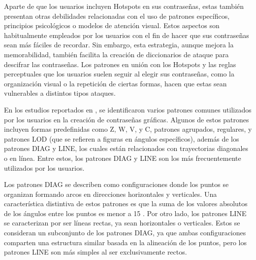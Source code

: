 \documentclass[12pt]{report}
\begin{document}
Aparte de que los usuarios incluyen Hotspots en sus contraseñas, estas también presentan otras debilidades relacionadas con el uso de patrones específicos, principios psicológicos o modelos de atención visual. Estos aspectos son habitualmente empleados por los usuarios con el fin de hacer que sus contraseñas sean más fáciles de recordar. Sin embargo, esta estrategia, aunque mejora la memorabilidad, también facilita la creación de diccionarios de ataque para descifrar las contraseñas. Los patrones en unión con los Hotspots y las reglas perceptuales que los usuarios suelen seguir al elegir sus contraseñas, como la organización visual o la repetición de ciertas formas, hacen que estas sean vulnerables a distintos tipos  ataques.



En los estudios reportados en \cite{5,20,21,22,23,24,25}, se identificaron varios patrones comunes utilizados por los usuarios en la creación de contraseñas gráficas. Algunos de estos patrones incluyen formas predefinidas como Z, W, V, y C, patrones agrupados, regulares, y patrones LOD (que se refieren a figuras en ángulos específicos), además de los patrones DIAG y LINE, los cuales están relacionados con trayectorias diagonales o en línea. Entre estos, los patrones DIAG y LINE son los más frecuentemente utilizados por los usuarios.

Los patrones DIAG se describen como configuraciones donde los puntos se organizan formando arcos en direcciones horizontales y verticales. Una característica distintiva de estos patrones es que la suma de los valores absolutos de los ángulos entre los puntos es menor a 15 \degree. Por otro lado, los patrones LINE se caracterizan por ser líneas rectas, ya sean horizontales o verticales. Estos se consideran un subconjunto de los patrones DIAG, ya que ambas configuraciones comparten una estructura similar basada en la alineación de los puntos, pero los patrones LINE son más simples al ser exclusivamente rectos.
\end{document}
